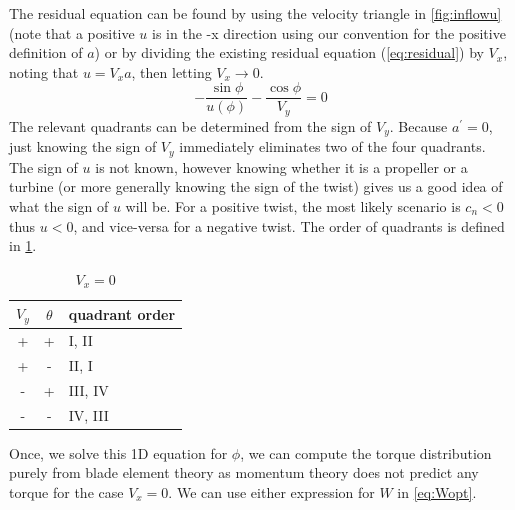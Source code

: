 \documentclass{article}
\begin{document}
The residual equation can be found by using the velocity triangle in \cref{fig:inflowu} (note that a positive $u$ is in the -x direction using our convention for the positive definition of $a$) or by dividing the existing residual equation (\cref{eq:residual}) by $V_x$, noting that $u = V_x a$, then letting $V_x \rightarrow 0$.
\begin{equation}
    - \frac{\sin\phi}{u(\phi)} - \frac{\cos\phi}{V_y} = 0
\end{equation}
The relevant quadrants can be determined from the sign of $V_y$.  Because $a^\prime = 0$, just knowing the sign of $V_y$ immediately eliminates two of the four quadrants.  The sign of $u$ is not known, however knowing whether it is a propeller or a turbine (or more generally knowing the sign of the twist) gives us a good idea of what the sign of $u$ will be.  For a positive twist, the most likely scenario is $c_n < 0$ thus $u < 0$, and vice-versa for a negative twist.  The order of quadrants is defined in \cref{tab:bracket2}.

\begin{table}[htb]
\centering
\caption{$V_x = 0$}
\label{tab:bracket2}
\begin{tabular}{@{}ccl@{}}
\toprule
$V_y$ & $\theta$ & quadrant order \\
\midrule
+ & + & I, II \\
+ & - & II, I \\
- & + & III, IV \\
- & - & IV, III \\
\bottomrule
\end{tabular}
\end{table}


Once, we solve this 1D equation for $\phi$, we can compute the torque distribution purely from blade element theory as momentum theory does not predict any torque for the case $V_x = 0$. We can use either expression for $W$ in \cref{eq:Wopt}.

\end{document}
